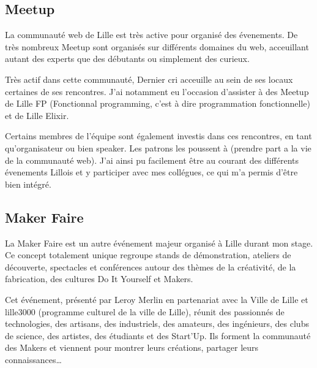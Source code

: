 \bigskip

\subsection{Meetup}\label{meetup}

\bigskip

La communauté web de Lille est très active pour organisé des évenements.
De très nombreux Meetup sont organisés sur différents domaines du web,
acceuillant autant des experts que des débutants ou simplement des
curieux.

\bigskip

Très actif dans cette communauté, Dernier cri acceuille au sein de ses
locaux certaines de ses rencontres. J'ai notamment eu l'occasion
d'assister à des Meetup de Lille FP (Fonctionnal programming, c'est à
dire programmation fonctionnelle) et de Lille Elixir.

\bigskip

Certains membres de l'équipe sont également investis dans ces
rencontres, en tant qu'organisateur ou bien speaker. Les patrons les
poussent à (prendre part a la vie de la communauté web). J'ai ainsi pu
facilement être au courant des différents évenements Lillois et y
participer avec mes collégues, ce qui m'a permis d'être bien intégré.

\bigskip

\subsection{Maker Faire}\label{maker-faire}

\bigskip

La Maker Faire est un autre événement majeur organisé à Lille durant mon
stage. Ce concept totalement unique regroupe stands de démonstration,
ateliers de découverte, spectacles et conférences autour des thèmes de
la créativité, de la fabrication, des cultures Do It Yourself et Makers.

\bigskip

Cet événement, présenté par Leroy Merlin en partenariat avec la Ville de
Lille et lille3000 (programme culturel de la ville de Lille), réunit des
passionnés de technologies, des artisans, des industriels, des amateurs,
des ingénieurs, des clubs de science, des artistes, des étudiants et des
Start'Up. Ils forment la communauté des Makers et viennent pour montrer
leurs créations, partager leurs connaissances\ldots{}

\bigskip

